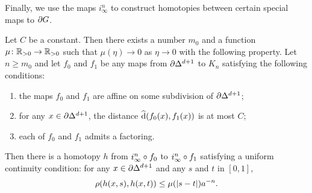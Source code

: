 \documentclass[a4paper]{article}
\begin{document}
Finally, we use the maps $i^n_\infty$ to construct homotopies between certain
special maps to $\partial G$.

\begin{proposition}\label{prop:basic_homotopies}
  Let $C$ be a constant. Then there exists a number $m_0$ and a function $\mu
  \colon \mathbb{R}_{>0}\to\mathbb{R}_{>0}$ such that $\mu(\eta)\to0$ as $\eta\to0$ with the following
  property. Let $n \geq m_0$ and let $f_0$ and $f_1$ be any maps from
  $\partial\Delta^{d+1}$ to $K_n$ satisfying the following conditions:
  \begin{enumerate}
    \item the maps $f_0$ and $f_1$ are affine on some subdivision of
      $\partial\Delta^{d+1}$;
    \item for any $x \in \partial\Delta^{d+1}$, the distance 
      $\operatorname{\widehat{d}}(f_0(x), f_1(x))$ is at most $C$;
    \item each of $f_0$ and $f_1$ admits a factoring.
  \end{enumerate}
  Then there is a homotopy $h$ from $i^n_\infty\circ f_0$ to
  $i^n_\infty\circ f_1$ satisfying a uniform continuity condition: for any
  $x \in \partial\Delta^{d+1}$ and any $s$ and $t$ in $[0,1]$,
  \begin{equation*}
    \rho(h(x,s), h(x,t)) \leq \mu(\left|s-t\right|)a^{-n}.
  \end{equation*}
\end{proposition}
\end{document}
